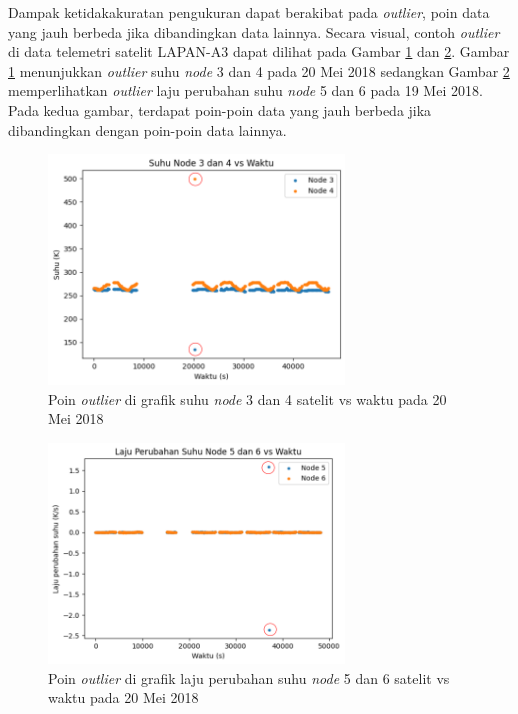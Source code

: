 Dampak ketidakakuratan pengukuran dapat berakibat pada \textit{outlier}, poin
data yang jauh berbeda jika dibandingkan data lainnya. Secara visual, contoh
\textit{outlier} di data telemetri satelit LAPAN-A3 dapat dilihat pada Gambar
\ref{fig:outliertemp} dan \ref{fig:outliertempchange}. Gambar
\ref{fig:outliertemp} menunjukkan \textit{outlier} suhu \textit{node} 3 dan 4
pada 20 Mei 2018 sedangkan Gambar \ref{fig:outliertempchange} memperlihatkan
\textit{outlier} laju perubahan suhu \textit{node} 5 dan 6 pada 19 Mei
2018. Pada kedua gambar, terdapat poin-poin data yang jauh berbeda jika
dibandingkan dengan poin-poin data lainnya.

\begin{figure}[H]
\setlength{}
\begin{center}
\includegraphics[width=0.7\textwidth]{fig/outliertemp.png}
	\caption{Poin \textit{outlier} di grafik suhu \textit{node} 3 dan 4 satelit vs waktu pada 20 Mei 2018}
\label{fig:outliertemp}
\end{center}
\end{figure}

\begin{figure}[H]
\setlength{}
\begin{center}
\includegraphics[width=0.7\textwidth]{fig/outliertempchange.png}
	\caption{Poin \textit{outlier} di grafik laju perubahan suhu \textit{node} 5 dan 6 satelit vs waktu pada 20 Mei 2018}
\label{fig:outliertempchange}
\end{center}
\end{figure}

